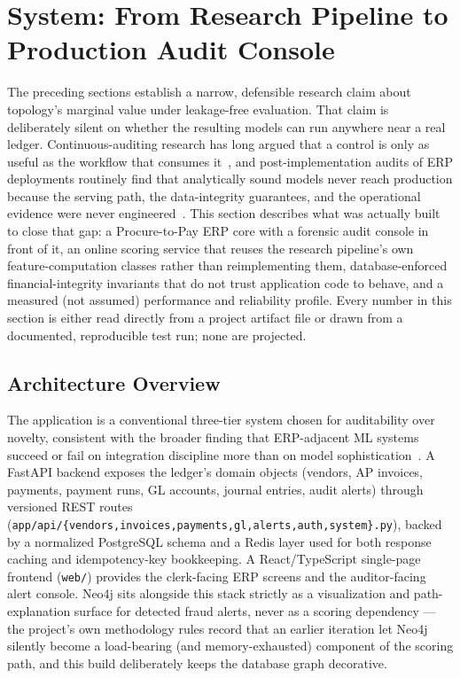 \section{System: From Research Pipeline to Production Audit Console}\label{sec:system}\label{sec:production}

The preceding sections establish a narrow, defensible research claim about topology's marginal value under leakage-free evaluation. That claim is deliberately silent on whether the resulting models can run anywhere near a real ledger. Continuous-auditing research has long argued that a control is only as useful as the workflow that consumes it~\cite{vasarhelyi2012acceptance}, and post-implementation audits of ERP deployments routinely find that analytically sound models never reach production because the serving path, the data-integrity guarantees, and the operational evidence were never engineered~\cite{mamakou2024postimplementation}. This section describes what was actually built to close that gap: a Procure-to-Pay ERP core with a forensic audit console in front of it, an online scoring service that reuses the research pipeline's own feature-computation classes rather than reimplementing them, database-enforced financial-integrity invariants that do not trust application code to behave, and a measured (not assumed) performance and reliability profile. Every number in this section is either read directly from a project artifact file or drawn from a documented, reproducible test run; none are projected.

\subsection{Architecture Overview}\label{sec:system-arch}

The application is a conventional three-tier system chosen for auditability over novelty, consistent with the broader finding that ERP-adjacent ML systems succeed or fail on integration discipline more than on model sophistication~\cite{jawad2024erp}. A FastAPI backend exposes the ledger's domain objects (vendors, AP invoices, payments, payment runs, GL accounts, journal entries, audit alerts) through versioned REST routes (\texttt{app/api/\{vendors,invoices,payments,gl,alerts,auth,system\}.py}), backed by a normalized PostgreSQL schema and a Redis layer used for both response caching and idempotency-key bookkeeping. A React/TypeScript single-page frontend (\texttt{web/}) provides the clerk-facing ERP screens and the auditor-facing alert console. Neo4j sits alongside this stack strictly as a visualization and path-explanation surface for detected fraud alerts, never as a scoring dependency — the project's own methodology rules record that an earlier iteration let Neo4j silently become a load-bearing (and memory-exhausted) component of the scoring path, and this build deliberately keeps the database graph decorative.

